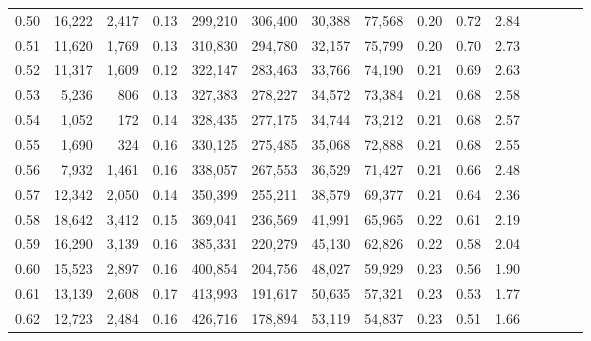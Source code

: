 \begin{tabular}{rrrcrrrrrrrrrrr}
0.50 &  16,222 &   2,417 &                                       0.13 &  299,210 &  306,400 &   30,388 &   77,568 &  0.20 &  0.72 &                         2.84 \\
0.51 &  11,620 &   1,769 &                                       0.13 &  310,830 &  294,780 &   32,157 &   75,799 &  0.20 &  0.70 &                         2.73 \\
0.52 &  11,317 &   1,609 &                                       0.12 &  322,147 &  283,463 &   33,766 &   74,190 &  0.21 &  0.69 &                         2.63 \\
0.53 &   5,236 &     806 &                                       0.13 &  327,383 &  278,227 &   34,572 &   73,384 &  0.21 &  0.68 &                         2.58 \\
0.54 &   1,052 &     172 &                                       0.14 &  328,435 &  277,175 &   34,744 &   73,212 &  0.21 &  0.68 &                         2.57 \\
0.55 &   1,690 &     324 &                                       0.16 &  330,125 &  275,485 &   35,068 &   72,888 &  0.21 &  0.68 &                         2.55 \\
0.56 &   7,932 &   1,461 &                                       0.16 &  338,057 &  267,553 &   36,529 &   71,427 &  0.21 &  0.66 &                         2.48 \\
0.57 &  12,342 &   2,050 &                                       0.14 &  350,399 &  255,211 &   38,579 &   69,377 &  0.21 &  0.64 &                         2.36 \\
0.58 &  18,642 &   3,412 &                                       0.15 &  369,041 &  236,569 &   41,991 &   65,965 &  0.22 &  0.61 &                         2.19 \\
0.59 &  16,290 &   3,139 &                                       0.16 &  385,331 &  220,279 &   45,130 &   62,826 &  0.22 &  0.58 &                         2.04 \\
0.60 &  15,523 &   2,897 &                                       0.16 &  400,854 &  204,756 &   48,027 &   59,929 &  0.23 &  0.56 &                         1.90 \\
0.61 &  13,139 &   2,608 &                                       0.17 &  413,993 &  191,617 &   50,635 &   57,321 &  0.23 &  0.53 &                         1.77 \\
0.62 &  12,723 &   2,484 &                                       0.16 &  426,716 &  178,894 &   53,119 &   54,837 &  0.23 &  0.51 &                         1.66 \\

\end{tabular}

